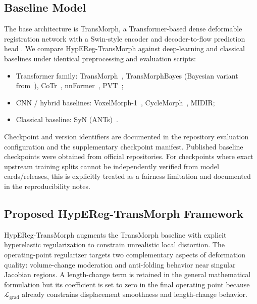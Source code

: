 \documentclass[jimaging,article,submit,pdftex,moreauthors]{Definitions/mdpi}
\begin{document}
\subsection{Baseline Model}
The base architecture is TransMorph, a Transformer-based dense deformable registration network with a Swin-style encoder and decoder-to-flow prediction head \cite{chen2022transmorph,liu2021swin}. We compare HypEReg-TransMorph against deep-learning and classical baselines under identical preprocessing and evaluation scripts:
\begin{itemize}
\item Transformer family: TransMorph~\cite{chen2022transmorph}, TransMorphBayes (Bayesian variant from~\cite{chen2022transmorph}), CoTr~\cite{xie2021cotr}, nnFormer~\cite{zhou2023nnformer}, PVT~\cite{wang2021pvt};
\item CNN / hybrid baselines: VoxelMorph-1~\cite{balakrishnan2019voxelmorph}, CycleMorph~\cite{kim2021cyclemorph}, MIDIR;
\item Classical baseline: SyN (ANTs)~\cite{avants2008ants}.
\end{itemize}
Checkpoint and version identifiers are documented in the repository evaluation configuration and the supplementary checkpoint manifest.
Published baseline checkpoints were obtained from official repositories. For checkpoints where exact upstream training splits cannot be independently verified from model cards/releases, this is explicitly treated as a fairness limitation and documented in the reproducibility notes.

\subsection{Proposed HypEReg-TransMorph Framework}
HypEReg-TransMorph augments the TransMorph baseline with explicit hyperelastic regularization to constrain unrealistic local distortion. The operating-point regularizer targets two complementary aspects of deformation quality: volume-change moderation and anti-folding behavior near singular Jacobian regions. A length-change term is retained in the general mathematical formulation but its coefficient is set to zero in the final operating point because \(\mathcal{L}_{\mathrm{grad}}\) already constrains displacement smoothness and length-change behavior.
\end{document}
